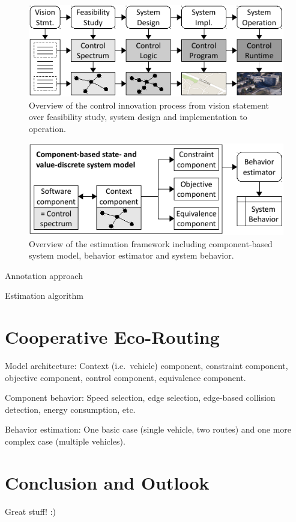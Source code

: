 \documentclass[conference]{../cls/IEEEtran}
\begin{document}
\begin{figure}[b]
	\centering
	\includegraphics{../gfx/process.pdf}
	\caption{Overview of the control innovation process from vision statement over feasibility study, system design and implementation to operation.}
	\label{figure:process}
\end{figure}

\begin{figure}[b]
	\centering
	\includegraphics{../gfx/framework.pdf}
	\caption{Overview of the estimation framework including component-based system model, behavior estimator and system behavior.}
	\label{figure:framework}
\end{figure}

Annotation approach \cite{Hackenberg2012}

Estimation algorithm

\section{Cooperative Eco-Routing}

Model architecture: Context (i.e.\ vehicle) component, constraint component, objective component, control component, equivalence component.

Component behavior: Speed selection, edge selection, edge-based collision detection, energy consumption, etc.

Behavior estimation: One basic case (single vehicle, two routes) and one more complex case (multiple vehicles).

\section{Conclusion and Outlook}

Great stuff! :)



\end{document}
